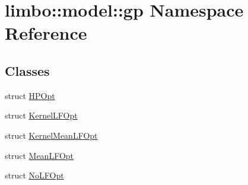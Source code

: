 \hypertarget{namespacelimbo_1_1model_1_1gp}{}\section{limbo\+:\+:model\+:\+:gp Namespace Reference}
\label{namespacelimbo_1_1model_1_1gp}
\subsection*{Classes}
\begin{DoxyCompactItemize}
\item 
struct \hyperlink{structlimbo_1_1model_1_1gp_1_1_h_p_opt}{H\+P\+Opt}
\item 
struct \hyperlink{structlimbo_1_1model_1_1gp_1_1_kernel_l_f_opt}{Kernel\+L\+F\+Opt}
\item 
struct \hyperlink{structlimbo_1_1model_1_1gp_1_1_kernel_mean_l_f_opt}{Kernel\+Mean\+L\+F\+Opt}
\item 
struct \hyperlink{structlimbo_1_1model_1_1gp_1_1_mean_l_f_opt}{Mean\+L\+F\+Opt}
\item 
struct \hyperlink{structlimbo_1_1model_1_1gp_1_1_no_l_f_opt}{No\+L\+F\+Opt}
\end{DoxyCompactItemize}
